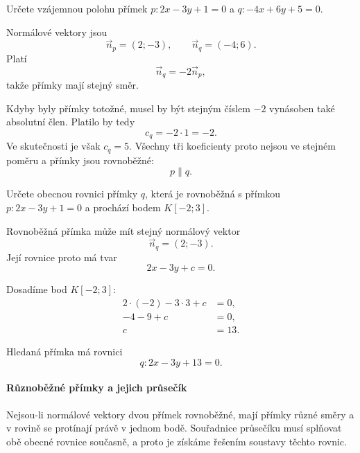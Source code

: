 \begin{example}\label{exa:Parallel_general_lines}
    Určete vzájemnou polohu přímek $p:2x-3y+1=0$ a $q:-4x+6y+5=0$.
    
    Normálové vektory jsou
    \[
        \vec{n}_p=(2;-3),
        \qquad
        \vec{n}_q=(-4;6).
    \]
    Platí
    \[
        \vec{n}_q=-2\vec{n}_p,
    \]
    takže přímky mají stejný směr.

    Kdyby byly přímky totožné, musel by být stejným číslem $-2$
    vynásoben také absolutní člen. Platilo by tedy
    \[
        c_q=-2\cdot1=-2.
    \]
    Ve skutečnosti je však $c_q=5$. Všechny tři koeficienty proto
    nejsou ve stejném poměru a přímky jsou rovnoběžné:
    \[
        p\parallel q.
    \]
\end{example}

\begin{example}\label{exa:Parallel_general_line_through_point}
    Určete obecnou rovnici přímky $q$, která je rovnoběžná s přímkou $p:2x - 3y + 1 = 0$ a prochází bodem $K[-2;3]$.

    Rovnoběžná přímka může mít stejný normálový vektor
    \[
        \vec{n}_q=(2;-3).
    \]
    Její rovnice proto má tvar
    \[
        2x-3y+c=0.
    \]

    Dosadíme bod $K[-2;3]$:
    \begin{align*}
        2\cdot(-2)-3\cdot3+c&=0,\\
        -4-9+c&=0,\\
        c&=13.
    \end{align*}

    Hledaná přímka má rovnici
    \[
        q:2x-3y+13=0.
    \]
\end{example}

\paragraph{Různoběžné přímky a jejich průsečík}
\label{subsubsec:Intersecting_general_lines}

Nejsou-li normálové vektory dvou přímek rovnoběžné, mají přímky různé
směry a v rovině se protínají právě v jednom bodě. Souřadnice průsečíku
musí splňovat obě obecné rovnice současně, a proto je získáme řešením
soustavy těchto rovnic.

